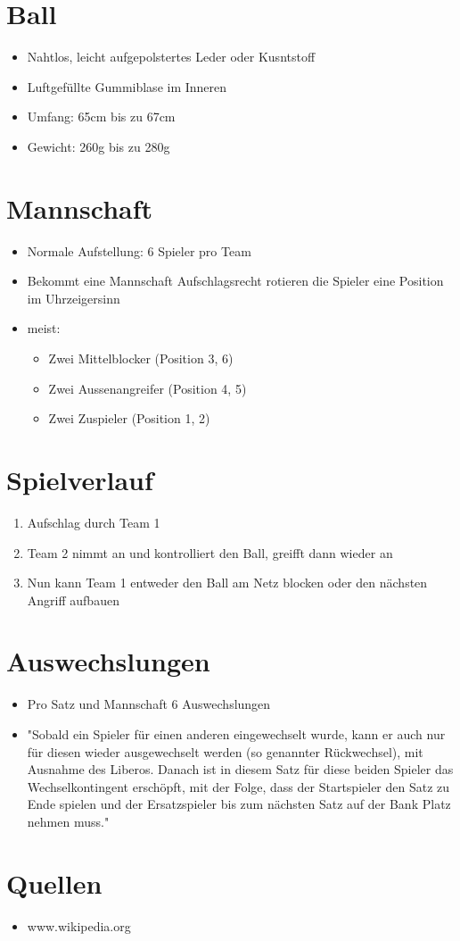 \documentclass{article}
\begin{document}
\section{Ball}
\begin{itemize}
  \item Nahtlos, leicht aufgepolstertes Leder oder Kusntstoff
  \item Luftgefüllte Gummiblase im Inneren
  \item Umfang: 65cm bis zu 67cm
  \item Gewicht: 260g bis zu 280g
\end{itemize}

\section{Mannschaft}
\begin{itemize}
  \item Normale Aufstellung: 6 Spieler pro Team
  \item Bekommt eine Mannschaft Aufschlagsrecht rotieren die Spieler eine Position im Uhrzeigersinn
  \item meist:
  \begin{itemize}
    \item Zwei Mittelblocker (Position 3, 6)
    \item Zwei Aussenangreifer (Position 4, 5)
    \item Zwei Zuspieler (Position 1, 2)
  \end{itemize}
\end{itemize}

\section{Spielverlauf}
\begin{enumerate}
  \item Aufschlag durch Team 1
  \item Team 2 nimmt an und kontrolliert den Ball, greifft dann wieder an
  \item Nun kann Team 1 entweder den Ball am Netz blocken oder den nächsten Angriff aufbauen
\end{enumerate}

\section{Auswechslungen}
\begin{itemize}
  \item Pro Satz und Mannschaft 6 Auswechslungen
  \item "Sobald ein Spieler für einen anderen eingewechselt wurde, kann er auch nur für diesen wieder ausgewechselt werden (so genannter Rückwechsel), mit Ausnahme des Liberos. Danach ist in diesem Satz für diese beiden Spieler das Wechselkontingent erschöpft, mit der Folge, dass der Startspieler den Satz zu Ende spielen und der Ersatzspieler bis zum nächsten Satz auf der Bank Platz nehmen muss."
\end{itemize}

\section*{Quellen}
\begin{itemize}
  \item www.wikipedia.org
\end{itemize}
\end{document}
